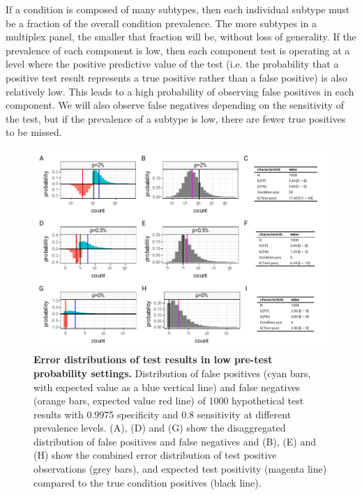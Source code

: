 \documentclass[10pt,letterpaper]{article}
\begin{document}
If a condition is composed of many subtypes, then each individual subtype must be a fraction of the overall condition prevalence. The more subtypes in a multiplex panel, the smaller that fraction will be, without loss of generality. If the prevalence of each component is low, then each component test is operating at a level where the positive predictive value of the test (i.e. the probability that a positive test result represents a true positive rather than a false positive) is also relatively low. This leads to a high probability of observing false positives in each component. We will also observe false negatives depending on the sensitivity of the test, but if the prevalence of a subtype is low, there are fewer true positives to be missed.

\begin{figure}[hb!]
\centerline{\includegraphics{fig/low-prevalence-sensitivity-specificity.pdf}}
\caption{{\bf Error distributions of test results in low pre-test probability settings.}
 Distribution of false positives (cyan bars, with expected value as a blue vertical line) and false negatives (orange bars, expected value red line) of 1000 hypothetical test results with 0.9975 specificity and 0.8 sensitivity at different prevalence levels. (A), (D) and (G) show the disaggregated distribution of false positives and false negatives and (B), (E) and (H) show the combined error distribution of test positive observations (grey bars), and expected test positivity (magenta line) compared to the true condition positives (black line).}
\label{fig2}
\end{figure}
\end{document}
